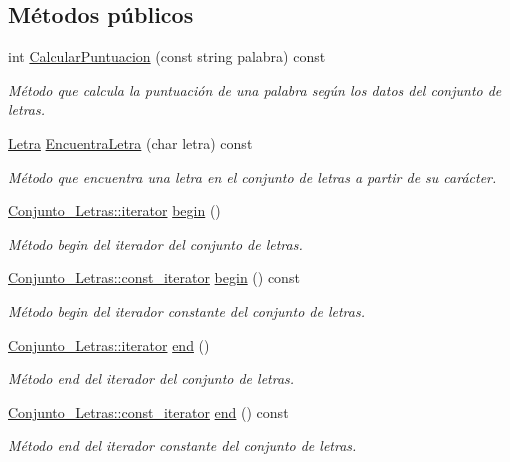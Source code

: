 \subsection*{Métodos públicos}
\begin{DoxyCompactItemize}
\item 
int \hyperlink{classConjunto__Letras_a2958b1e88656da47fb1d7e527dbb0853}{Calcular\+Puntuacion} (const string palabra) const
\begin{DoxyCompactList}\small\item\em Método que calcula la puntuación de una palabra según los datos del conjunto de letras. \end{DoxyCompactList}\item 
\hyperlink{classLetra}{Letra} \hyperlink{classConjunto__Letras_ac004308c22155ad0f3a9f2a890f03727}{Encuentra\+Letra} (char letra) const
\begin{DoxyCompactList}\small\item\em Método que encuentra una letra en el conjunto de letras a partir de su carácter. \end{DoxyCompactList}\item 
\hyperlink{classConjunto__Letras_a2be8a16582f74bbe7561955083f02a52}{Conjunto\+\_\+\+Letras\+::iterator} \hyperlink{classConjunto__Letras_aaefd083db74ab48e49f747dd47147e02}{begin} ()
\begin{DoxyCompactList}\small\item\em Método begin del iterador del conjunto de letras. \end{DoxyCompactList}\item 
\hyperlink{classConjunto__Letras_a66b252ad22ca76b522ef68fc7e6d09b1}{Conjunto\+\_\+\+Letras\+::const\+\_\+iterator} \hyperlink{classConjunto__Letras_a05e3def044414513abc7d6048de5f9ce}{begin} () const
\begin{DoxyCompactList}\small\item\em Método begin del iterador constante del conjunto de letras. \end{DoxyCompactList}\item 
\hyperlink{classConjunto__Letras_a2be8a16582f74bbe7561955083f02a52}{Conjunto\+\_\+\+Letras\+::iterator} \hyperlink{classConjunto__Letras_a29f4eafc4df0b35a596bae262d53a7cb}{end} ()
\begin{DoxyCompactList}\small\item\em Método end del iterador del conjunto de letras. \end{DoxyCompactList}\item 
\hyperlink{classConjunto__Letras_a66b252ad22ca76b522ef68fc7e6d09b1}{Conjunto\+\_\+\+Letras\+::const\+\_\+iterator} \hyperlink{classConjunto__Letras_a1e84b5382d45645267eb8c50884679f1}{end} () const
\begin{DoxyCompactList}\small\item\em Método end del iterador constante del conjunto de letras. \end{DoxyCompactList}\end{DoxyCompactItemize}
